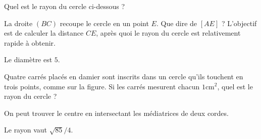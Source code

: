 \begin{exo}
Quel est le rayon du cercle ci-dessous ?
\begin{center}
\end{center}
\begin{hint}
La droite $(BC)$ recoupe le cercle en  un point $E$. Que dire de $[AE]$ ?
L'objectif est de calculer la distance $CE$, après quoi le rayon du cercle est relativement rapide à obtenir.
\end{hint}
\begin{sol}
Le diamètre est $5$.
\end{sol}
\end{exo}

\begin{exo}
Quatre carrés placés en damier sont inscrits dans un cercle qu'ils touchent en trois points, comme sur la figure.
Si les carrés mesurent chacun $1\mathrm{cm}^2$, quel est le rayon du cercle ?

\begin{center}
\end{center}
\begin{hint}
On peut trouver le centre en intersectant les médiatrices de deux cordes.
\end{hint}
\begin{sol}
Le rayon vaut $\sqrt{85}/4$.
\end{sol}
\end{exo}





